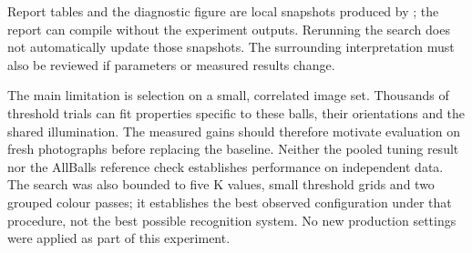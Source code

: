 Report tables and the diagnostic figure are local snapshots produced by
; the report can compile
without the experiment outputs. Rerunning the search does not automatically
update those snapshots. The surrounding interpretation must also be reviewed
if parameters or measured results change.

The main limitation is selection on a small, correlated image set. Thousands
of threshold trials can fit properties specific to these balls, their
orientations and the shared illumination. The measured gains should therefore
motivate evaluation on fresh photographs before replacing the baseline.
Neither the pooled tuning result nor the AllBalls reference check establishes
performance on independent data. The search was also bounded to five K values,
small threshold grids and two grouped colour passes; it establishes the best
observed configuration under that procedure, not the best possible recognition
system. No new production settings were applied as part of this experiment.
